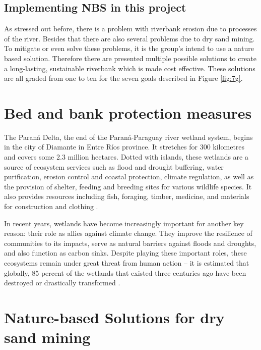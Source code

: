 \subsection{Implementing NBS in this project}

As stressed out before, there is a problem with riverbank erosion due to processes of the river. Besides that there are also several problems due to dry sand mining. To mitigate or even solve these problems, it is the group's intend to use a nature based solution. Therefore there are presented multiple possible solutions to create a long-lasting, sustainable riverbank which is made cost effective. These solutions are all graded from one to ten for the seven goals described in Figure \ref{fig:7g}. 


\section{Bed and bank protection measures}
The Paraná Delta, the end of the Paraná-Paraguay river wetland system, begins in the city of Diamante in Entre Ríos province. It stretches for 300 kilometres and covers some 2.3 million hectares. Dotted with islands, these wetlands are a source of ecosystem services such as flood and drought buffering, water purification, erosion control and coastal protection, climate regulation, as well as the provision of shelter, feeding and breeding sites for various wildlife species. It also provides resources including fish, foraging, timber, medicine, and materials for construction and clothing \autocite{hibaParanaRiverEcological2024}.

In recent years, wetlands have become increasingly important for another key reason: their role as allies against climate change. They improve the resilience of communities to its impacts, serve as natural barriers against floods and droughts, and also function as carbon sinks. Despite playing these important roles, these ecosystems remain under great threat from human action – it is estimated that globally, 85 percent of the wetlands that existed three centuries ago have been destroyed or drastically transformed \autocite{hibaParanaRiverEcological2024}.

\section{Nature-based Solutions for dry sand mining}


